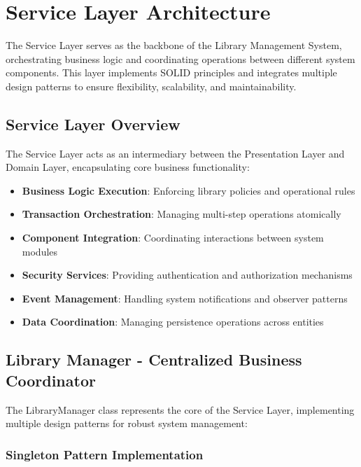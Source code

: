 \section{Service Layer Architecture}

The Service Layer serves as the backbone of the Library Management System, orchestrating business logic and coordinating operations between different system components. This layer implements SOLID principles and integrates multiple design patterns to ensure flexibility, scalability, and maintainability.

\subsection{Service Layer Overview}

The Service Layer acts as an intermediary between the Presentation Layer and Domain Layer, encapsulating core business functionality:

\begin{itemize}
	\item \textbf{Business Logic Execution}: Enforcing library policies and operational rules
	\item \textbf{Transaction Orchestration}: Managing multi-step operations atomically
	\item \textbf{Component Integration}: Coordinating interactions between system modules
	\item \textbf{Security Services}: Providing authentication and authorization mechanisms
	\item \textbf{Event Management}: Handling system notifications and observer patterns
	\item \textbf{Data Coordination}: Managing persistence operations across entities
\end{itemize}

\subsection{Library Manager - Centralized Business Coordinator}

The LibraryManager class represents the core of the Service Layer, implementing multiple design patterns for robust system management:

\subsubsection{Singleton Pattern Implementation}

